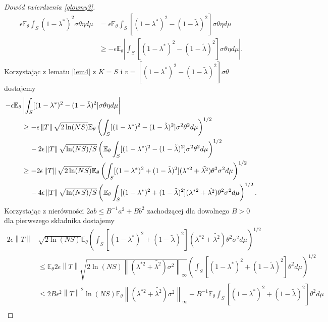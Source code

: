 \documentclass[man,mfiu]{mgrwms}
\newcommand{\norm}[1]{\left\lVert#1\right\rVert}
\begin{document}
\begin{proof}[Dowód twierdzenia \ref{glowny3}]
\begin{displaymath}
\begin{split}
\epsilon\mathbb{E}_{\theta}\int_S(1-\lambda^*)^2\sigma \theta \eta d\mu&=
\epsilon\mathbb{E}_{\theta}\int_S[(1-\lambda^*)^2-(1-\tilde{\lambda})^2]\sigma \theta \eta d\mu\\
&\geq -\epsilon\mathbb{E}_{\theta}\left|\int_S[(1-\lambda^*)^2-(1-\tilde{\lambda})^2]\sigma \theta \eta d\mu\right|.
\end{split}
\end{displaymath}
Korzystając z lematu \ref{lem4} z $K=S$ i $v=[(1-\lambda^*)^2-(1-\tilde{\lambda})^2]\sigma \theta $ dostajemy
\begin{displaymath}
\begin{split}
-\epsilon\mathbb{E}_{\theta}&\left|\int_S[(1-\lambda^*)^2-(1-\tilde{\lambda})^2]\sigma \theta \eta d\mu\right|\\
&\geq -\epsilon\norm{T}\sqrt{2\ln (NS)}\mathbb{E}_{\theta}\left(\int_S[(1-\lambda^*)^2-(1-\tilde{\lambda})^2]\sigma^2\theta ^2 d\mu\right)^{1/2}\\
&\hspace{4mm}-2\epsilon\norm{T}\sqrt{\ln (NS)/S}\left(\mathbb{E}_{\theta}\int_S[(1-\lambda^*)^2-(1-\tilde{\lambda})^2]\sigma^2\theta ^2 d\mu\right)^{1/2}\\
&\geq -2\epsilon\norm{T}\sqrt{2\ln (NS)}\mathbb{E}_{\theta}\left(\int_S[(1-\lambda^*)^2+(1-\tilde{\lambda})^2](\lambda^{*2}+\tilde{\lambda^2})\theta ^2\sigma^2d\mu\right)^{1/2}\\
&\hspace{4mm}-4\epsilon\norm{T}\sqrt{\ln (NS)/S}\left(\mathbb{E}_{\theta}\int_S[(1-\lambda^*)^2+(1-\tilde{\lambda})^2](\lambda^{*2}+\tilde{\lambda^2})\theta ^2\sigma^2 d\mu\right)^{1/2}.
\end{split}
\end{displaymath}
Korzystając  z nierówności $2ab\leq B^{-1}a^2+Bb^2$ zachodzącej dla dowolnego $B>0$ dla pierwszego składnika dostajemy
\begin{displaymath}
\begin{split}
2\epsilon\norm{T}&\sqrt{2\ln (NS)}\mathbb{E}_{\theta}\left(\int_S[(1-\lambda^*)^2+(1-\tilde{\lambda})^2](\lambda^{*2}+\tilde{\lambda^2})\theta ^2\sigma^2d\mu\right)^{1/2}\\
&\leq \mathbb{E}_{\theta}2\epsilon\norm{T}\sqrt{2\ln (NS)\norm{(\lambda^{*2}+\tilde{\lambda^2})\sigma^2}_{\infty}}\left(\int_S[(1-\lambda^*)^2+(1-\tilde{\lambda})^2]\theta ^2d\mu\right)^{1/2}\\
&\leq 2B\epsilon^2\norm{T}^2 \ln (NS)\mathbb{E}_{\theta}\norm{(\lambda^{*2}+\tilde{\lambda^2})\sigma^2}_{\infty}+B^{-1}\mathbb{E}_{\theta}\int_S[(1-\lambda^*)^2+(1-\tilde{\lambda})^2]\theta ^2d\mu\\

\end{split}
\end{displaymath}
\end{proof}
\end{document}
